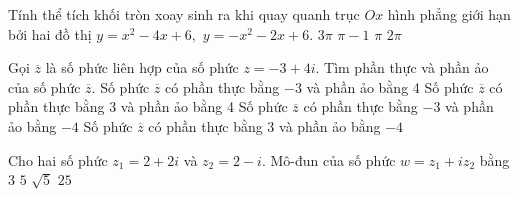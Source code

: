 \begin{ex}%
Tính thể tích khối tròn xoay sinh ra khi quay quanh trục $Ox$ hình phẳng giới hạn bởi hai đồ thị $y=x^2-4x+6,$  $y=-x^2-2x+6.$
\choice
{\True $3\pi $}
{$\pi-1$}
{$\pi $}
{$2\pi $}
\end{ex}

\begin{ex}%
Gọi $\overline{z}$ là số phức liên hợp của số phức $z=-3+4 i$. Tìm phần thực và phần ảo của số phức $\overline{z}$.
\choice
{Số phức $\overline{z}$ có phần thực bằng $-3$ và phần ảo bằng 4 }
{Số phức $\overline{z}$ có phần thực bằng 3 và phần ảo bằng 4 }
{\True Số phức $\overline{z}$ có phần thực bằng $-3$ và phần ảo bằng $-4$}
{Số phức $\overline{z}$ có phần thực bằng 3 và phần ảo bằng $-4$}
\end{ex}

\begin{ex}%
Cho hai số phức $z_1=2+2i$ và $z_2=2-i$. Mô-đun của số phức $w=z_1+iz_2$ bằng
\choice
{$3$}
{\True $5$}
{$\sqrt{5}$}
{$25$}
\end{ex}

